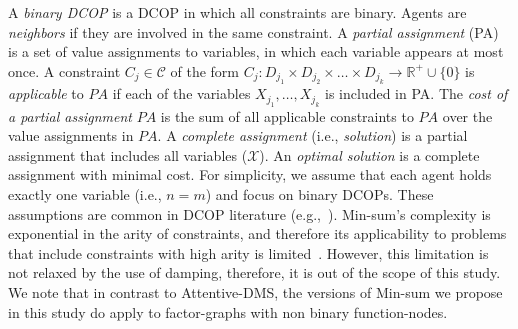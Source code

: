 A {\em binary DCOP} is a DCOP in which all constraints are binary. Agents are {\em neighbors} if they are involved in the same constraint. A {\em partial assignment} (PA) is a set of value assignments to variables, in which each variable appears at most once. A constraint $C_j \in {\mathcal C}$ of the form $C_j : D_{j_1} \times D_{j_2} \times \ldots \times D_{j_k} \rightarrow \mathbb{R}^+ \cup \{0\}$ is {\em applicable} to $PA$ if each of the variables $X_{j_1} , \ldots , X_{j_k}$ is included in PA. The {\em cost of a partial assignment} $PA$ is the sum of all applicable constraints to $PA$ over the value assignments in $PA$. A {\em complete assignment} (i.e., {\em solution}) is a partial assignment that includes all variables ($\mathcal X$). An {\em optimal solution} is a complete assignment with minimal cost.
For simplicity, we assume that each agent holds exactly one variable (i.e., $n=m$) and focus on binary DCOPs. These assumptions are common in DCOP literature (e.g.,~\cite{Petcu05b,YeohFK10}).
Min-sum's complexity is exponential in the arity of constraints, and therefore its applicability to problems that include constraints with high arity is limited~\cite{FarinelliRPJ08,YedidsionZF18}. However, this limitation is not relaxed by the use of damping, therefore, it is out of the scope of this study. We note that in contrast to Attentive-DMS, the versions of Min-sum we propose in this study do apply to factor-graphs with non binary function-nodes.
